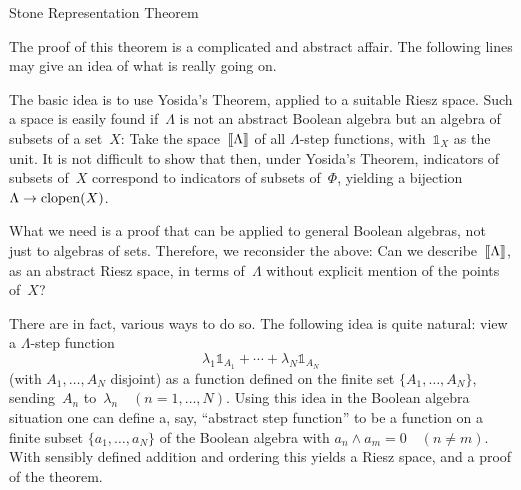 \documentclass[main.tex]{subfiles}
\begin{document}
%
%
\begin{psec}{3.20}{Stone Representation Theorem}
\end{psec}
The proof of this theorem
is a complicated and abstract affair.
The following lines may give an idea 
of what is really going on.

The basic idea is to use Yosida's Theorem,
applied to a suitable Riesz space.
Such a space is easily found if~$\Lambda$
is not an abstract Boolean algebra
but an algebra of subsets of a set~$X$:
Take the space~$\lbb\Lambda\rbb$
of all $\Lambda$-step functions,
with~$\mathbb{1}_X$ as the unit.
It is not difficult to show that then,
under Yosida's Theorem,
indicators of subsets of~$X$ correspond 
to indicators of subsets of~$\Phi$,
yielding a bijection $\Lambda \rightarrow \mathrm{clopen}(X)$.

What we need is a proof that can be applied
to general Boolean algebras,
not just to algebras of sets.
Therefore,
we reconsider the above:
Can we describe~$\lbb \Lambda \rbb$,
as an abstract Riesz space,
in terms of~$\Lambda$
without explicit mention of the points of~$X$?

There are in fact,
various ways to do so.
The following idea is quite natural:
view a $\Lambda$-step function
\begin{equation*}
\label{eq3.20rem} \tag{$*$}
\lambda_1 \mathbb{1}_{A_1} + \dotsb + \lambda_N \mathbb{1}_{A_N}
\end{equation*}
(with $A_1,\dotsc,A_N$ disjoint)
as a function defined on the finite set
$\{A_1,\dotsc,A_N\}$, sending~$A_n$ to~$\lambda_n\quad (n=1,\dotsc,N)$.
Using this idea in the Boolean algebra situation
one can define a, say,
``abstract step function''
to be a function on a finite subset $\{a_1,\dotsc,a_N\}$
of the Boolean algebra
with $a_n\wedge a_m=0\quad(n\neq m)$.
With sensibly defined addition and ordering
this yields a Riesz space,
and a proof of the theorem.
\end{document}
